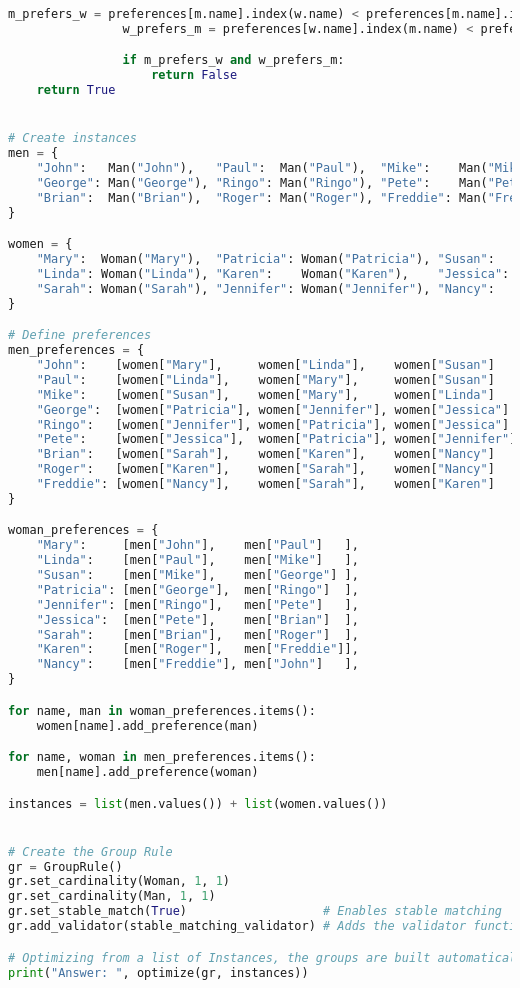\begin{lstlisting}[language=Python, caption={Creating and solving the Stable Marriage Problem using this framework.}, label={script:stable_marriage}]
                m_prefers_w = preferences[m.name].index(w.name) < preferences[m.name].index(current_w.name)
                w_prefers_m = preferences[w.name].index(m.name) < preferences[w.name].index(current_m.name)

                if m_prefers_w and w_prefers_m:
                    return False
    return True


# Create instances
men = {
    "John":   Man("John"),   "Paul":  Man("Paul"),  "Mike":    Man("Mike"),
    "George": Man("George"), "Ringo": Man("Ringo"), "Pete":    Man("Pete"),
    "Brian":  Man("Brian"),  "Roger": Man("Roger"), "Freddie": Man("Freddie")
}

women = {
    "Mary":  Woman("Mary"),  "Patricia": Woman("Patricia"), "Susan":   Woman("Susan"),
    "Linda": Woman("Linda"), "Karen":    Woman("Karen"),    "Jessica": Woman("Jessica"),
    "Sarah": Woman("Sarah"), "Jennifer": Woman("Jennifer"), "Nancy":   Woman("Nancy")
}

# Define preferences
men_preferences = {
    "John":    [women["Mary"],     women["Linda"],    women["Susan"]   ],
    "Paul":    [women["Linda"],    women["Mary"],     women["Susan"]   ],
    "Mike":    [women["Susan"],    women["Mary"],     women["Linda"]   ],
    "George":  [women["Patricia"], women["Jennifer"], women["Jessica"] ],
    "Ringo":   [women["Jennifer"], women["Patricia"], women["Jessica"] ],
    "Pete":    [women["Jessica"],  women["Patricia"], women["Jennifer"]],
    "Brian":   [women["Sarah"],    women["Karen"],    women["Nancy"]   ],
    "Roger":   [women["Karen"],    women["Sarah"],    women["Nancy"]   ],
    "Freddie": [women["Nancy"],    women["Sarah"],    women["Karen"]   ],
}

woman_preferences = {
    "Mary":     [men["John"],    men["Paul"]   ],
    "Linda":    [men["Paul"],    men["Mike"]   ],
    "Susan":    [men["Mike"],    men["George"] ],
    "Patricia": [men["George"],  men["Ringo"]  ],
    "Jennifer": [men["Ringo"],   men["Pete"]   ],
    "Jessica":  [men["Pete"],    men["Brian"]  ],
    "Sarah":    [men["Brian"],   men["Roger"]  ],
    "Karen":    [men["Roger"],   men["Freddie"]],
    "Nancy":    [men["Freddie"], men["John"]   ],
}

for name, man in woman_preferences.items():
    women[name].add_preference(man)

for name, woman in men_preferences.items():
    men[name].add_preference(woman)

instances = list(men.values()) + list(women.values())


# Create the Group Rule
gr = GroupRule()
gr.set_cardinality(Woman, 1, 1)
gr.set_cardinality(Man, 1, 1)
gr.set_stable_match(True)                   # Enables stable matching
gr.add_validator(stable_matching_validator) # Adds the validator function

# Optimizing from a list of Instances, the groups are built automatically.
print("Answer: ", optimize(gr, instances))
\end{lstlisting}

